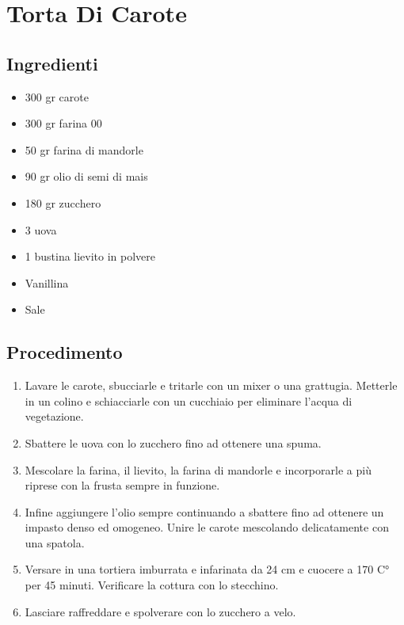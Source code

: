\section{Torta Di Carote}
\subsection{Ingredienti}
\begin{itemize}
\item 300 gr carote  
\item 300 gr farina 00  
\item 50 gr farina di mandorle  
\item 90 gr olio di semi di mais  
\item 180 gr zucchero  
\item 3 uova  
\item 1 bustina lievito in polvere  
\item Vanillina   
\item Sale
\end{itemize}
\subsection{Procedimento}
\begin{enumerate}
\item  Lavare le carote, sbucciarle e tritarle con un mixer o una grattugia. Metterle in un colino e schiacciarle con un cucchiaio per eliminare l'acqua di vegetazione.  
\item  Sbattere le uova con lo zucchero fino ad ottenere una spuma.  
\item  Mescolare la farina, il lievito, la farina di mandorle e incorporarle a più riprese con la frusta sempre in funzione.  
\item  Infine aggiungere l'olio sempre continuando a sbattere fino ad ottenere un impasto denso ed omogeneo. Unire le carote mescolando delicatamente con una spatola.  
\item  Versare in una tortiera imburrata e infarinata da 24 cm e cuocere a 170 C° per 45 minuti. Verificare la cottura con lo stecchino.  
\item  Lasciare raffreddare e spolverare con lo zucchero a velo.
\end{enumerate}
